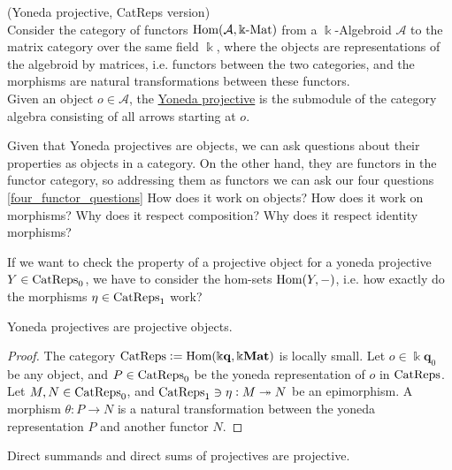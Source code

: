 \begin{definition}{(Yoneda projective, CatReps version)}\label{la:yoneda_projective}\\
Consider the category of functors $\textup{Hom}( \mathcal{A}, \Bbbk\textup{-Mat} )$ from a $\Bbbk$-Algebroid $\mathcal{A}$ to the matrix category
over the same field $\Bbbk$, where the objects are representations of the algebroid by matrices, i.e. functors between the two categories, and
the morphisms are natural transformations between these functors.\\
\noindent Given an object $o \in \mathcal{A}$, the \ul{Yoneda projective} is the submodule of the category algebra consisting of all arrows
starting at $o$.
\end{definition}

Given that Yoneda projectives are objects, we can ask questions about their properties as objects in a category. On the other hand, they are
functors in the functor category, so addressing them as functors we can ask our four questions \ref{four_functor_questions} 
How does it work on objects? How does it work on morphisms? Why does it respect composition? Why does it respect identity morphisms?

If we want to check the property of a projective object for a yoneda projective $Y \in \textup{CatReps}_{0}$, we have to consider the
hom-sets $\textup{Hom}(Y,-)$, i.e. how exactly do the morphisms $\eta \in \textup{CatReps}_{1}$ work?



\begin{lemma}
Yoneda projectives are projective objects.
\begin{proof}
The category $\textup{CatReps} := \textup{Hom}(\Bbbk \mathbf{q}, \Bbbk\mathbf{Mat})$ is locally small.
Let $o \in \Bbbk \mathbf{q}_{0}$ be any object, and $P \in \textup{CatReps}_{0}$ be the yoneda representation of $o$ in $\textup{CatReps}$.
Let $M, N \in \textup{CatReps}_{0}$, and $\textup{CatReps}_{1} \ni \eta : M \twoheadrightarrow N$ be an epimorphism.
A morphism $\theta : P \rightarrow N$ is a natural transformation between the yoneda representation $P$ and another functor $N$.
\end{proof}
\end{lemma}

Direct summands and direct sums of projectives are projective.

